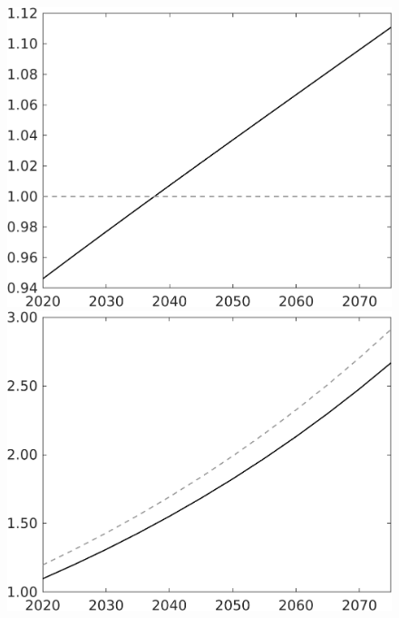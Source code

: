 \documentclass[12pt]{article}
\begin{document}
\begin{figure}[h!!]
\begin{minipage}[]{0.32\textwidth}
	\end{minipage}	
	\begin{minipage}[]{0.32\textwidth}
		\includegraphics[width=1\textwidth]{../../codding_model/own_basedOnFried/optimalPol_010922_revision/figures/all_13Sept22/CompTaul_LFBAU_Reg0_lambdaa_spillover0_nsk0_xgr0_knspil0_sep1_countec0_GovRev0_etaa0.79_lgd0.png}
	\end{minipage}	
	\begin{minipage}[]{0.32\textwidth}
		\includegraphics[width=1\textwidth]{../../codding_model/own_basedOnFried/optimalPol_010922_revision/figures/all_13Sept22/CompTaul_LFBAU_Reg0_Y_spillover0_nsk0_xgr0_knspil0_sep1_countec0_GovRev0_etaa0.79_lgd0.png}

\end{minipage}
\end{figure}
\end{document}
